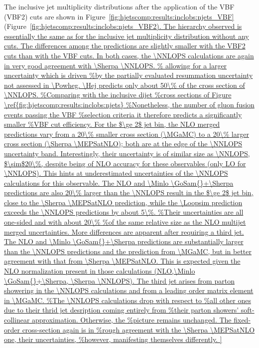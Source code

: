 The inclusive jet multiplicity distributions after the application of the VBF (VBF2)
cuts are shown in 
Figure~\ref{fig:hjetscomp:results:inclobs:njets_VBF} (Figure~\ref{fig:hjetscomp:results:inclobs:njets_VBF2).
 The hierarchy observed
is essentially the same as for the inclusive jet multiplicity
distribution without any cuts. The differences among the predictions
are slightly smaller with the VBF2 cuts than with the VBF cuts. 
In both cases, the \NNLOPS calculations are again in very good agreement 
with \Sherpa \NNLOPS.
\Hej  predicts only about 50\% of the cross section of  
\NNLOPS. 
For the $\ge 2$ jet bin, the NLO merged predictions vary from a 20\% 
smaller cross section (\MGaMC) to a 20\% larger cross section 
(\Sherpa \MEPSatNLO); both are at the edge of 
the \NNLOPS uncertainty band. Interestingly, their uncertainty is of 
similar size as  \NNLOPS, $\sim$20\%, despite being of NLO 
accuracy for these observables (only LO for \NNLOPS). This hints 
at  underestimated uncertainties of the \NNLOPS calculations for 
this observable. The NLO and \Minlo \GoSam{}+\Sherpa predictions are 
also 20\% larger than the \NNLOPS result in the $\ge 2$ jet bin, close to the \Sherpa \MEPSatNLO 
prediction, while the \Loopsim prediction exceeds the \NNLOPS predictions 
by about 5\%. 
More differences are apparent after requiring a third jet. The  
NLO and \Minlo \GoSam{}+\Sherpa predictions are substantially larger than the 
\NNLOPS predictions and the prediction from \MGaMC, but in better agreement
with that from \Sherpa \MEPSatNLO. This is expected given the NLO normalization
present in those calculations (NLO,\Minlo \GoSam{}+\Sherpa, \Sherpa \NNLOPS). The third jet  arises
from parton showering in the \NNLOPS calculations and from a leading order matrix element in \MGaMC.

}
